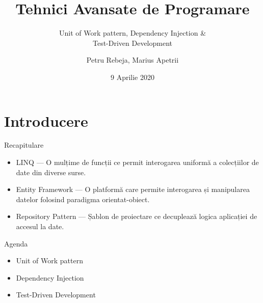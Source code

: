 \documentclass[presentation]{beamer}
\author{Petru Rebeja, Marius Apetrii}
\date{9 Aprilie 2020}
\title{Tehnici Avansate de Programare}
\subtitle{Unit of Work pattern, Dependency Injection \& \\ Test-Driven Development}
\institute[UAIC]{Facultatea de Matematică\\Universitatea Alexandru Ioan Cuza, Iași}
\begin{document}
\maketitle
\section{Introducere}
\label{sec:org5de5e7e}
\begin{frame}[label={sec:org771e328}]{Recapitulare}
\begin{itemize}
\item \alert{LINQ} --- O mulțime de funcții ce permit interogarea uniformă a colecțiilor de date din diverse surse.
\item \alert{Entity Framework} --- O platformă care permite interogarea și manipularea datelor folosind paradigma orientat-obiect.
\item \alert{Repository Pattern} --- Șablon de proiectare ce decuplează logica aplicației de accesul la date.
\end{itemize}
\end{frame}
\begin{frame}[label={sec:org18e36e2}]{Agenda}
\begin{itemize}
\item Unit of Work pattern
\item Dependency Injection
\item Test-Driven Development
\end{itemize}
\end{frame}
\end{document}
